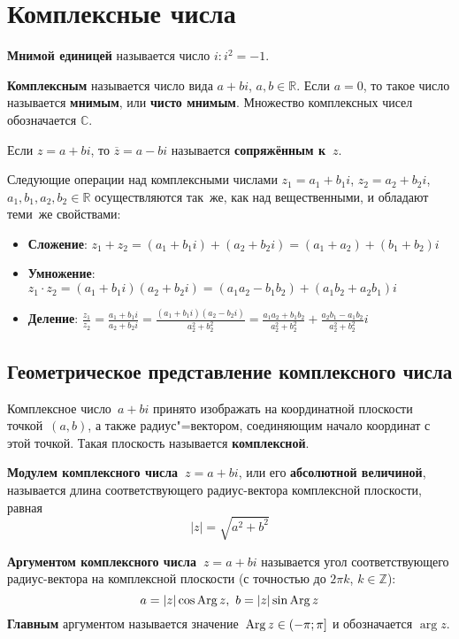 \section{Комплексные числа}
  \textbf{Мнимой единицей} называется число $i \colon i^2 = -1$.

 \textbf{Комплексным} называется число вида $a + bi$, $a, b \in \mathbb R$.
 Если $a = 0$, то такое число называется \textbf{мнимым}, или \textbf{чисто мнимым}.
 Множество комплексных чисел обозначается $\mathbb C$.

Если $z = a + bi$, то $\overline z = a - bi$ называется \textbf{сопряжённым к~$z$}.

Следующие операции над комплексными числами $z_1 = a_1 + b_1 i$, $z_2 = a_2 + b_2 i$, $a_1, b_1, a_2, b_2 \in \mathbb R$ осуществляются так~же, как над вещественными, и обладают теми~же свойствами:
\begin{itemize}
	\item \textbf{Сложение}: $z_1 + z_2 = (a_1 + b_1 i) + (a_2 + b_2 i) = (a_1 + a_2) + (b_1 + b_2)i$
	\item \textbf{Умножение}: $z_1 \cdot z_2 = (a_1 + b_1 i)(a_2 + b_2 i) = (a_1 a_2 - b_1 b_2) + (a_1 b_2 + a_2 b_1)i$
	\item \textbf{Деление}: $\displaystyle \frac{z_1}{z_2} = \frac{a_1 + b_1 i}{a_2 + b_2 i} =
	\frac{(a_1 + b_1 i)(a_2 - b_2 i)}{a_2^2 + b_2^2} =
	\frac{a_1 a_2 + b_1 b_2}{a_2^2 + b_2^2} + \frac{a_2 b_1 - a_1 b_2}{a_2^2 + b_2^2} i$
\end{itemize}

\subsection{Геометрическое представление комплексного числа}
Комплексное число~$a + bi$ принято изображать на координатной плоскости точкой~$(a, b)$, а также ра\-ди\-ус"=век\-то\-ром, соединяющим начало координат с этой точкой.
Такая плоскость называется \textbf{комплексной}.

\textbf{Модулем комплексного числа~$z = a + bi$}, или его \textbf{абсолютной величиной}, называется длина соответствующего радиус-вектора комплексной плоскости, равная
\begin{equation*}
|z| = \sqrt{a^2 + b^2}
\end{equation*}

 \textbf{Аргументом комплексного числа~$z = a + bi$} называется угол соответствующего радиус-вектора на комплексной плоскости (с точностью до $2\pi k$, $k \in \mathbb Z$):
\begin{equation*}
a = |z| \cos \operatorname{Arg} z, \ b = |z| \sin \operatorname{Arg} z
\end{equation*}
 \textbf{Главным} аргументом называется значение~$\operatorname{Arg} z \in (-\pi; \pi]$ и обозначается $\arg z$.

